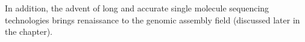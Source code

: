 In addition, the advent of long and accurate single molecule sequencing technologies brings renaissance to the genomic assembly field (discussed later in the chapter). 





